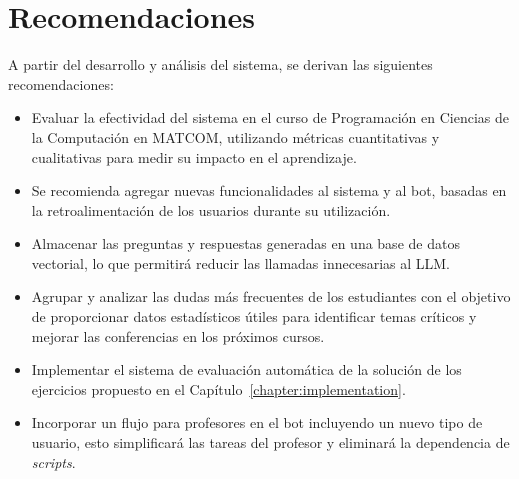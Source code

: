 \documentclass{article}
\begin{document}
\section{Recomendaciones}

A partir del desarrollo y análisis del sistema, se derivan las siguientes recomendaciones:

\begin{itemize}
    \item Evaluar la efectividad del sistema en el curso de Programación en Ciencias de la Computación en \mbox{MATCOM}, utilizando métricas cuantitativas y cualitativas para medir su impacto en el aprendizaje.
    
    \item Se recomienda agregar nuevas funcionalidades al sistema y al bot, basadas en la retroalimentación de los usuarios durante su utilización.
    
    \item Almacenar las preguntas y respuestas generadas en una base de datos vectorial, lo que permitirá reducir las llamadas innecesarias al LLM.

    \item Agrupar y analizar las dudas más frecuentes de los estudiantes con el objetivo de proporcionar datos estadísticos útiles para identificar temas críticos y mejorar las conferencias en los próximos cursos.
    
    \item Implementar el sistema de evaluación automática de la solución de los ejercicios propuesto en el Capítulo~\ref{chapter:implementation}.
    
    \item Incorporar un flujo para profesores en el bot incluyendo un nuevo tipo de usuario, esto simplificará las tareas del profesor y eliminará la dependencia de \textit{scripts}.
\end{itemize}
\end{document}

